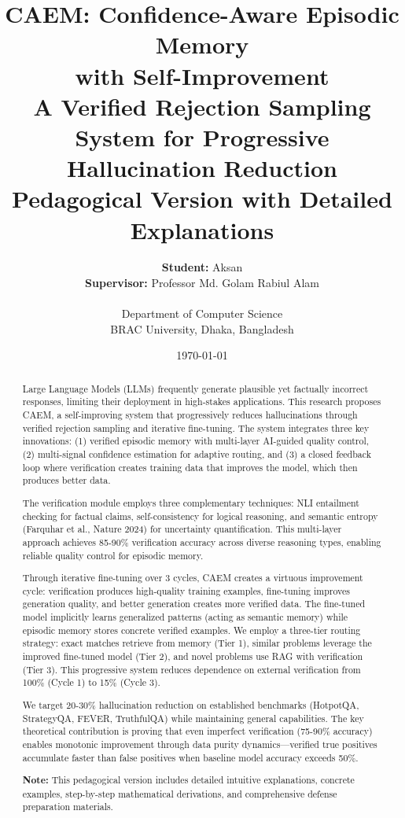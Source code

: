 \documentclass[12pt,a4paper]{article}
\title{\textbf{CAEM: Confidence-Aware Episodic Memory\\with Self-Improvement}\\
\vspace{0.5cm}
\large A Verified Rejection Sampling System for Progressive Hallucination Reduction\\
\vspace{0.3cm}
\large \textbf{Pedagogical Version with Detailed Explanations}}
\author{
\textbf{Student:} Aksan\\
\textbf{Supervisor:} Professor Md. Golam Rabiul Alam\\
\\
Department of Computer Science\\
BRAC University, Dhaka, Bangladesh
}
\date{\today}
\theoremstyle{definition}
\newcommand{\caem}{\textsc{CAEM}}
\begin{document}
\maketitle

\begin{abstract}
Large Language Models (LLMs) frequently generate plausible yet factually incorrect responses, limiting their deployment in high-stakes applications. This research proposes \caem{}, a self-improving system that progressively reduces hallucinations through verified rejection sampling and iterative fine-tuning. The system integrates three key innovations: (1) verified episodic memory with multi-layer AI-guided quality control, (2) multi-signal confidence estimation for adaptive routing, and (3) a closed feedback loop where verification creates training data that improves the model, which then produces better data.

The verification module employs three complementary techniques: NLI entailment checking for factual claims, self-consistency for logical reasoning, and semantic entropy (Farquhar et al., Nature 2024) for uncertainty quantification. This multi-layer approach achieves 85-90\% verification accuracy across diverse reasoning types, enabling reliable quality control for episodic memory.

Through iterative fine-tuning over 3 cycles, \caem{} creates a virtuous improvement cycle: verification produces high-quality training examples, fine-tuning improves generation quality, and better generation creates more verified data. The fine-tuned model implicitly learns generalized patterns (acting as semantic memory) while episodic memory stores concrete verified examples. We employ a three-tier routing strategy: exact matches retrieve from memory (Tier 1), similar problems leverage the improved fine-tuned model (Tier 2), and novel problems use RAG with verification (Tier 3). This progressive system reduces dependence on external verification from 100\% (Cycle 1) to 15\% (Cycle 3).

We target 20-30\% hallucination reduction on established benchmarks (HotpotQA, StrategyQA, FEVER, TruthfulQA) while maintaining general capabilities. The key theoretical contribution is proving that even imperfect verification (75-90\% accuracy) enables monotonic improvement through data purity dynamics—verified true positives accumulate faster than false positives when baseline model accuracy exceeds 50\%.

\textbf{Note:} This pedagogical version includes detailed intuitive explanations, concrete examples, step-by-step mathematical derivations, and comprehensive defense preparation materials.
\end{abstract}
\end{document}

